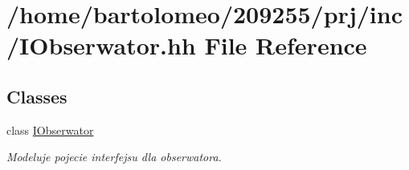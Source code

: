 \hypertarget{_i_obserwator_8hh}{\section{/home/bartolomeo/209255/prj/inc/\-I\-Obserwator.hh File Reference}
\label{_i_obserwator_8hh}
}
\subsection*{Classes}
\begin{DoxyCompactItemize}
\item 
class \hyperlink{class_i_obserwator}{I\-Obserwator}
\begin{DoxyCompactList}\small\item\em Modeluje pojecie interfejsu dla obserwatora. \end{DoxyCompactList}\end{DoxyCompactItemize}
